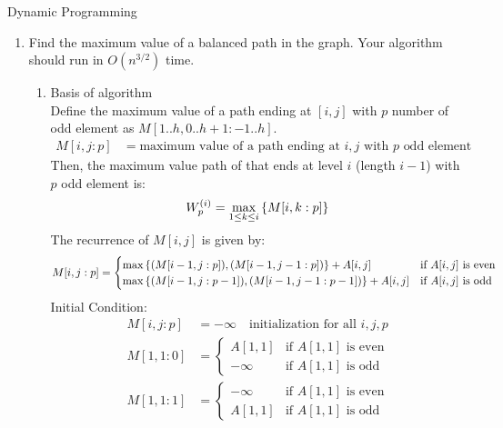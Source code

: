 \documentclass{article}
\numberwithin{table}{section}
\numberwithin{figure}{section}
\begin{document}
\begin{section}{Dynamic Programming}
\begin{enumerate}
    \newpage 
    \item Find the maximum value of a balanced path in the graph. Your algorithm should run in $O(n^{3/2})$ time.
    \begin{tcolorbox}[breakable]
        \begin{enumerate}
            \item Basis of algorithm \\
            Define the maximum value of a path ending at $[i,j]$ with $p$ number of odd element as $M[1..h, 0..h+1 : -1..h]$.
            \begin{align*}
                M[i,j : p] &= \text{maximum value of a path ending at $i,j$ with $p$ odd element}
            \end{align*}
            Then, the maximum value path of that ends at level $i$ (length $i-1$) with $p$ odd element is:
            \begin{align*}
                W_p^{\left(i\right)} = \max_{1 \leq k \leq i}\left\{M[i, k : p]\right\}
            \end{align*}
            The recurrence of $M[i, j]$ is given by:
            \begin{align*}
                M[i, j : p] &= 
                \begin{cases}
                    \max \left\{(M[i-1, j : p]), (M[i-1, j-1 : p] )\right\} + A[i, j] & \text{if $A[i, j]$ is even} \\
                    \max \left\{(M[i-1, j : p-1]), (M[i-1, j-1 : p-1])\right\} + A[i, j] & \text{if $A[i, j]$ is odd} 
                \end{cases}
            \end{align*}
            Initial Condition:
            \begin{align*}
                M[i, j : p] &= -\infty \quad \text{initialization for all $i, j, p$}\\
                M[1, 1 : 0] &= 
                \begin{cases}
                    A[1, 1] & \text{if $A[1, 1]$ is even} \\
                    -\infty   & \text{if $A[1, 1]$ is odd}
                \end{cases} \\
                M[1, 1 : 1] &= 
                \begin{cases}
                    -\infty & \text{if $A[1, 1]$ is even} \\
                    A[1, 1]   & \text{if $A[1, 1]$ is odd}
                \end{cases}
            \end{align*}
            

\end{enumerate}
\end{tcolorbox}
\end{enumerate}
\end{section}
\end{document}
